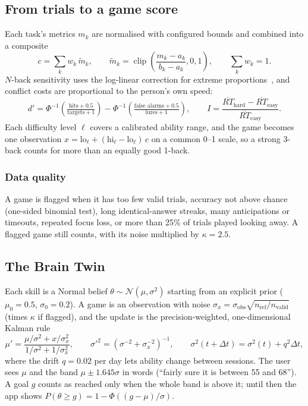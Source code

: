 \documentclass[11pt,a4paper]{article}
\begin{document}
\subsection{From trials to a game score}
Each task's metrics $m_k$ are normalised with configured bounds and combined into a composite
\begin{equation}
c=\sum_k w_k\,\tilde m_k,\qquad \tilde m_k=\operatorname{clip}\!\left(\frac{m_k-a_k}{b_k-a_k},0,1\right),\qquad \sum_k w_k=1 .
\end{equation}
$N$-back sensitivity uses the log-linear correction for extreme proportions~\cite{hautus}, and conflict costs are proportional to the person's own speed:
\begin{equation}
d'=\Phi^{-1}\!\left(\tfrac{\text{hits}+0.5}{\text{targets}+1}\right)-\Phi^{-1}\!\left(\tfrac{\text{false alarms}+0.5}{\text{lures}+1}\right),\qquad
I=\frac{\overline{RT}_{\text{hard}}-\overline{RT}_{\text{easy}}}{\overline{RT}_{\text{easy}}} .
\end{equation}
Each difficulty level $\ell$ covers a calibrated ability range, and the game becomes one observation $x=\text{lo}_\ell+(\text{hi}_\ell-\text{lo}_\ell)\,c$ on a common 0--1 scale, so a strong 3-back counts for more than an equally good 1-back.

\subsubsection{Data quality} A game is flagged when it has too few valid trials, accuracy not above chance (one-sided binomial test), long identical-answer streaks, many anticipations or timeouts, repeated focus loss, or more than 25\% of trials played looking away. A flagged game still counts, with its noise multiplied by $\kappa=2.5$.

\subsection{The Brain Twin}
Each skill is a Normal belief $\theta\sim\mathcal N(\mu,\sigma^2)$ starting from an explicit prior ($\mu_0=0.5$, $\sigma_0=0.2$). A game is an observation with noise $\sigma_x=\sigma_{\text{obs}}\sqrt{n_{\text{ref}}/n_{\text{valid}}}$ (times $\kappa$ if flagged), and the update is the precision-weighted, one-dimensional Kalman rule
\begin{equation}
\mu'=\frac{\mu/\sigma^2+x/\sigma_x^2}{1/\sigma^2+1/\sigma_x^2},\qquad \sigma'^2=\left(\sigma^{-2}+\sigma_x^{-2}\right)^{-1},\qquad \sigma^2(t+\Delta t)=\sigma^2(t)+q^2\Delta t,
\end{equation}
where the drift $q=0.02$ per day lets ability change between sessions. The user sees $\mu$ and the band $\mu\pm1.645\sigma$ in words (``fairly sure it is between 55 and 68''). A goal $g$ counts as reached only when the whole band is above it; until then the app shows $P(\theta\ge g)=1-\Phi((g-\mu)/\sigma)$.
\end{document}
